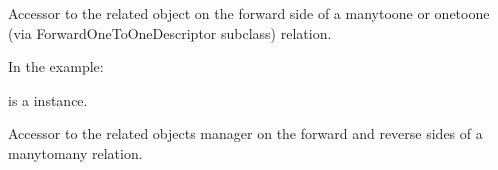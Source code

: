 \documentclass[letterpaper,10pt,english]{sphinxmanual}
\begin{document}
\begin{fulllineitems}
\begin{fulllineitems}
\end{fulllineitems}


\begin{fulllineitems}
\label{\detokenize{users:users.models.CustomUser.updated_by}}
\pysigstartsignatures
\pysigline
{}
\pysigstopsignatures
\sphinxAtStartPar
Accessor to the related object on the forward side of a many\sphinxhyphen{}to\sphinxhyphen{}one or
one\sphinxhyphen{}to\sphinxhyphen{}one (via ForwardOneToOneDescriptor subclass) relation.

\sphinxAtStartPar
In the example:

\begin{sphinxVerbatim}[commandchars=\\\{\}]
       
\end{sphinxVerbatim}

\sphinxAtStartPar
{} is a  instance.

\end{fulllineitems}


\begin{fulllineitems}
\label{\detokenize{users:users.models.CustomUser.updated_by_id}}
\pysigstartsignatures
\pysigline
{}
\pysigstopsignatures
\end{fulllineitems}


\begin{fulllineitems}
\label{\detokenize{users:users.models.CustomUser.user_permissions}}
\pysigstartsignatures
\pysigline
{}
\pysigstopsignatures
\sphinxAtStartPar
Accessor to the related objects manager on the forward and reverse sides of
a many\sphinxhyphen{}to\sphinxhyphen{}many relation.


\end{fulllineitems}
\end{fulllineitems}
\end{document}
